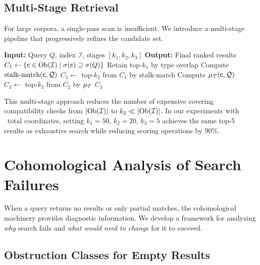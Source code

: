 \documentclass[11pt]{article}
\newcommand{\SemIndex}{\mathcal{I}}
\newcommand{\QuerySheaf}{\mathcal{Q}}
\newcommand{\MatchScore}{\mu}
\newcommand{\StalknMatch}{\mathrm{stalk\text{-}match}}
\begin{document}
\subsection{Multi-Stage Retrieval}

For large corpora, a single-pass scan is insufficient.  We introduce a
multi-stage pipeline that progressively refines the candidate set.

\begin{algorithm}[H]
\caption{Multi-Stage Sheaf-Indexed Retrieval}
\label{alg:multi-stage}
\begin{algorithmic}[1]
\STATE \textbf{Input:} Query $Q$, index $\SemIndex$, stages $[k_1, k_2, k_3]$
\STATE \textbf{Output:} Final ranked results
\STATE {}
\STATE $C_1 \gets \{\coord \in \Ob(\SemIndex) \mid \sigma(\coord) \supseteq \sigma(Q)\}$
\STATE Retain top-$k_1$ by type overlap
\STATE {}
  \STATE Compute $\StalknMatch(\coord, \QuerySheaf)$
\ENDFOR
\STATE $C_2 \gets$ top-$k_2$ from $C_1$ by $\StalknMatch$
\STATE {}
  \STATE Compute $\MatchScore_{\trust}(\coord, \QuerySheaf)$
\ENDFOR
\STATE $C_3 \gets$ top-$k_3$ from $C_2$ by $\MatchScore_{\trust}$
\RETURN $C_3$
\end{algorithmic}
\end{algorithm}

This multi-stage approach reduces the number of expensive covering
compatibility checks from $|\Ob(\SemIndex)|$ to $k_2 \ll |\Ob(\SemIndex)|$.
In our experiments with \compCoordsSum\ total coordinates, setting
$k_1 = 50$, $k_2 = 20$, $k_3 = 5$ achieves the same top-5 results as
exhaustive search while reducing scoring operations by $90$\%.

\section{Cohomological Analysis of Search Failures}\label{sec:cohomological}

When a query returns no results or only partial matches, the
cohomological machinery provides diagnostic information.  We develop
a framework for analyzing \emph{why} search fails and \emph{what would
need to change} for it to succeed.

\subsection{Obstruction Classes for Empty Results}
\end{document}
